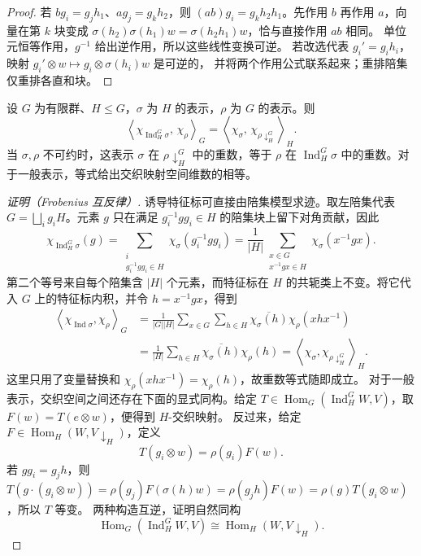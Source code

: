 \begin{proof}
若 $bg_i=g_jh_1$、$ag_j=g_kh_2$，则
$(ab)g_i=g_kh_2h_1$。先作用 $b$ 再作用 $a$，向量在第 $k$ 块变成
$\sigma(h_2)\sigma(h_1)w=\sigma(h_2h_1)w$，恰与直接作用 $ab$ 相同。
单位元恒等作用，$g^{-1}$ 给出逆作用，所以这些线性变换可逆。
若改选代表 $g_i'=g_i h_i$，映射
$g_i'\otimes w\mapsto g_i\otimes\sigma(h_i)w$ 是可逆的，
并将两个作用公式联系起来；重排陪集仅重排各直和块。
\end{proof}

\begin{theorem}
设 $G$ 为有限群、$H\leqslant G$，$\sigma$ 为 $H$ 的表示，$\rho$ 为 $G$ 的表示。则
\[
\left\langle\chi_{\operatorname{Ind}_H^G\sigma},\,\chi_\rho\right\rangle_G
=
\left\langle\chi_\sigma,\,\chi_{\rho\downarrow_H^G}\right\rangle_H.
\]
当 $\sigma,\rho$ 不可约时，这表示 $\sigma$ 在 $\rho\downarrow_H^G$ 中的重数，等于 $\rho$ 在 $\operatorname{Ind}_H^G\sigma$ 中的重数。对于一般表示，等式给出交织映射空间维数的相等。
\label{thm:frobenius-reciprocity}
\end{theorem}
\par\medskip
\begin{proof}[证明（Frobenius 互反律）]
诱导特征标可直接由陪集模型求迹。取左陪集代表 \(G=\bigsqcup_i g_iH\)。元素 \(g\) 只在满足 \(g_i^{-1}gg_i\in H\) 的陪集块上留下对角贡献，因此
\begin{equation}
\chi_{\operatorname{Ind}_H^G\sigma}(g)
=\sum_{\substack{i\\g_i^{-1}gg_i\in H}}
\chi_\sigma(g_i^{-1}gg_i)
=\frac1{|H|}
\sum_{\substack{x\in G\\x^{-1}gx\in H}}
\chi_\sigma(x^{-1}gx).
\label{eq:induced-char-coset}
\end{equation}
第二个等号来自每个陪集含 \(|H|\) 个元素，而特征标在 \(H\) 的共轭类上不变。将它代入 \(G\) 上的特征标内积，并令 \(h=x^{-1}gx\)，得到
\begin{align*}
\left\langle\chi_{\operatorname{Ind}\sigma},\chi_\rho\right\rangle_G
&=\frac1{|G||H|}
\sum_{x\in G}\sum_{h\in H}
\overline{\chi_\sigma(h)}\chi_\rho(xhx^{-1})\\
&=\frac1{|H|}\sum_{h\in H}
\overline{\chi_\sigma(h)}\chi_\rho(h)
=\left\langle\chi_\sigma,\chi_{\rho\downarrow_H^G}\right\rangle_H .
\end{align*}
这里只用了变量替换和 \(\chi_\rho(xhx^{-1})=\chi_\rho(h)\)，故重数等式随即成立。
对于一般表示，交织空间之间还存在下面的显式同构。给定
$T\in\operatorname{Hom}_G(\operatorname{Ind}_H^G W,V)$，取
$F(w)=T(e\otimes w)$，便得到 $H$-交织映射。
反过来，给定 $F\in\operatorname{Hom}_H(W,V\downarrow_H)$，定义
\[
T(g_i\otimes w)=\rho(g_i)F(w).
\]
若 $gg_i=g_jh$，则
$T(g\cdot(g_i\otimes w))=\rho(g_j)F(\sigma(h)w)
=\rho(g_jh)F(w)=\rho(g)T(g_i\otimes w)$，所以 $T$ 等变。
两种构造互逆，证明自然同构
\[
\operatorname{Hom}_G(\operatorname{Ind}_H^G W,V)
\cong\operatorname{Hom}_H(W,V\downarrow_H).
\]
\end{proof}

